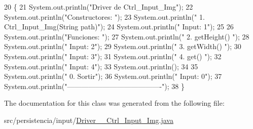 \begin{DoxyCode}
20                                      \{
21         System.out.println(\textcolor{stringliteral}{"Driver de Ctrl\_Input\_Img"});
22         System.out.println(\textcolor{stringliteral}{"Constructores: "});
23         System.out.println(\textcolor{stringliteral}{"     1. Ctrl\_Input\_Img(String path)"});
24         System.out.println(\textcolor{stringliteral}{"     Input: 1"});
25 
26         System.out.println(\textcolor{stringliteral}{"Funciones: "});
27         System.out.println(\textcolor{stringliteral}{"     2. getHeight() "});
28         System.out.println(\textcolor{stringliteral}{"     Input: 2"});
29         System.out.println(\textcolor{stringliteral}{"     3. getWidth() "});
30         System.out.println(\textcolor{stringliteral}{"     Input: 3"});
31         System.out.println(\textcolor{stringliteral}{"     4. get() "});
32         System.out.println(\textcolor{stringliteral}{"     Input: 4"});
33         System.out.println();
34 
35         System.out.println(\textcolor{stringliteral}{"     0. Sortir"});
36         System.out.println(\textcolor{stringliteral}{"     Input: 0"});
37         System.out.println(\textcolor{stringliteral}{"----------------------------------------"});
38     \}
\end{DoxyCode}


The documentation for this class was generated from the following file\+:\begin{DoxyCompactItemize}
\item 
src/persistencia/input/\hyperlink{Driver____Ctrl__Input__Img_8java}{Driver\+\_\+\+\_\+\+Ctrl\+\_\+\+Input\+\_\+\+Img.\+java}\end{DoxyCompactItemize}
